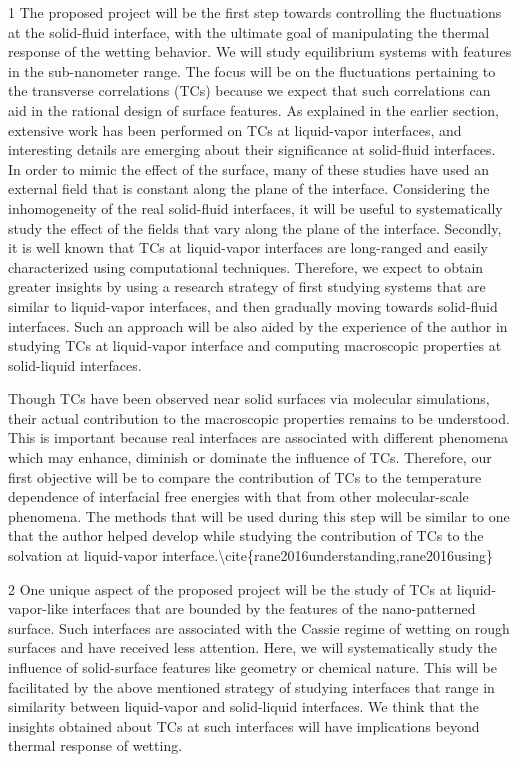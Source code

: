 \par 1 The proposed project will be the first step towards controlling the fluctuations at the solid-fluid interface, with the ultimate goal of manipulating the thermal response of the wetting behavior. We will study equilibrium systems with features in the sub-nanometer range. The focus will be on the fluctuations pertaining to the transverse correlations (TCs) because we expect that such correlations can aid in the rational design of surface features.  As explained in the earlier section, extensive work has been performed on TCs at liquid-vapor interfaces, and interesting details are emerging about their significance at solid-fluid interfaces. In order to mimic the effect of the surface, many of these studies have used an external field that is constant along the plane of the interface. Considering the inhomogeneity of the real solid-fluid interfaces, it will be useful to systematically study the effect of the fields that vary along the plane of the interface. Secondly, it is well known that TCs at liquid-vapor interfaces are long-ranged and easily characterized using computational techniques. Therefore, we expect to obtain greater insights by using a research strategy of first studying systems that are similar to liquid-vapor interfaces, and then gradually moving towards solid-fluid interfaces. Such an approach will be also aided by the experience of the author in studying TCs at liquid-vapor interface and computing macroscopic properties at solid-liquid interfaces.
\par Though TCs have been observed near solid surfaces via molecular simulations, their actual contribution to the macroscopic properties remains to be understood. This is important because real interfaces are associated with different phenomena which may enhance, diminish or dominate the influence of TCs. Therefore, our first objective will be to compare the contribution of TCs to the temperature dependence of interfacial free energies with that from other molecular-scale phenomena. The methods that will be used during this step will be similar to one that the author helped develop while studying the contribution of TCs to the solvation at liquid-vapor interface.\textbackslash cite\{rane2016understanding,rane2016using\}
\par 2 One unique aspect of the proposed project will be the study of TCs at liquid-vapor-like interfaces that are bounded by the features of the nano-patterned surface. Such interfaces are associated with the Cassie regime of wetting on rough surfaces and have received less attention. Here, we will systematically study the influence of solid-surface features like geometry or chemical nature. This will be facilitated by the above mentioned strategy of studying interfaces that range in similarity between liquid-vapor and solid-liquid interfaces. We think that the insights obtained about TCs at such interfaces will have implications beyond thermal response of wetting.
